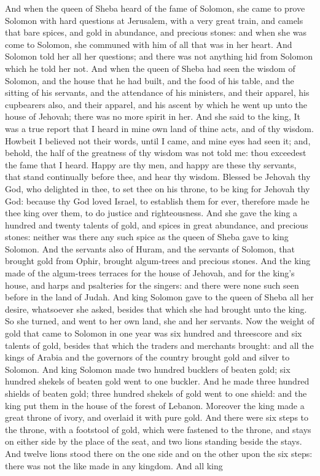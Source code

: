 And when the queen of Sheba heard of the fame of Solomon, she came to prove Solomon with hard questions at Jerusalem, with a very great train, and camels that bare spices, and gold in abundance, and precious stones: and when she was come to Solomon, she communed with him of all that was in her heart. And Solomon told her all her questions; and there was not anything hid from Solomon which he told her not. And when the queen of Sheba had seen the wisdom of Solomon, and the house that he had built, and the food of his table, and the sitting of his servants, and the attendance of his ministers, and their apparel, his cupbearers also, and their apparel, and his ascent by which he went up unto the house of Jehovah; there was no more spirit in her. And she said to the king, It was a true report that I heard in mine own land of thine acts, and of thy wisdom. Howbeit I believed not their words, until I came, and mine eyes had seen it; and, behold, the half of the greatness of thy wisdom was not told me: thou exceedest the fame that I heard. Happy are thy men, and happy are these thy servants, that stand continually before thee, and hear thy wisdom. Blessed be Jehovah thy God, who delighted in thee, to set thee on his throne, to be king for Jehovah thy God: because thy God loved Israel, to establish them for ever, therefore made he thee king over them, to do justice and righteousness.  And she gave the king a hundred and twenty talents of gold, and spices in great abundance, and precious stones: neither was there any such spice as the queen of Sheba gave to king Solomon. And the servants also of Huram, and the servants of Solomon, that brought gold from Ophir, brought algum-trees and precious stones. And the king made of the algum-trees terraces for the house of Jehovah, and for the king’s house, and harps and psalteries for the singers: and there were none such seen before in the land of Judah. And king Solomon gave to the queen of Sheba all her desire, whatsoever she asked, besides that which she had brought unto the king. So she turned, and went to her own land, she and her servants.  Now the weight of gold that came to Solomon in one year was six hundred and threescore and six talents of gold, besides that which the traders and merchants brought: and all the kings of Arabia and the governors of the country brought gold and silver to Solomon. And king Solomon made two hundred bucklers of beaten gold; six hundred shekels of beaten gold went to one buckler. And he made three hundred shields of beaten gold; three hundred shekels of gold went to one shield: and the king put them in the house of the forest of Lebanon. Moreover the king made a great throne of ivory, and overlaid it with pure gold. And there were six steps to the throne, with a footstool of gold, which were fastened to the throne, and stays on either side by the place of the seat, and two lions standing beside the stays. And twelve lions stood there on the one side and on the other upon the six steps: there was not the like made in any kingdom. And all king 